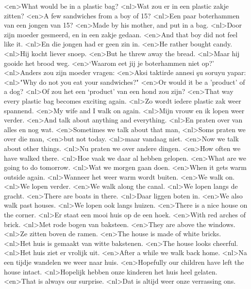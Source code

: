 <en>What would be in a plastic bag?
<nl>Wat zou er in een plastic zakje zitten?
<en>A few sandwiches from a boy of 15?
<nl>Een paar boterhammen van een jongen van 15?
<en>Made by his mother, and put in a bag.
<nl>Door zijn moeder gesmeerd, en in een zakje gedaan.
<en>And that boy did not feel like it.
<nl>En die jongen had er geen zin in.
<en>He rather bought candy.
<nl>Hij kocht liever snoep.
<en>But he threw away the bread.
<nl>Maar hij gooide het brood weg.
<en>`Waarom eet jij je boterhammen niet op?'
<nl>Anders zou zijn moeder vragen:
<en>Aksi taktirde annesi şu soruyu yapar:
<nl>"Why do not you eat your sandwiches?"
<en>Or  would it  be a 'product' of a dog?
<nl>Of zou het een `product' van een hond zou zijn?
<en>That way every plastic bag becomes exciting again.
<nl>Zo wordt iedere plastic zak weer spannend.
<en>My wife and I walk on again.
<nl>Mijn vrouw en ik lopen weer verder.
<en>And talk about anything and everything.
<nl>En praten over van alles en nog wat.
<en>Sometimes we talk about that man,
<nl>Soms praten we over die man,
<en>but not today.
<nl>maar vandaag niet.
<en>Now we talk about other things.
<nl>Nu praten we over andere dingen.
<en>How often we have walked there.
<nl>Hoe vaak we daar al hebben gelopen.
<en>What are we going to do tomorrow.
<nl>Wat we morgen gaan doen.
<en>When it  gets warm outside again.
<nl>Wanneer het weer warm wordt buiten.
<en>We walk on.
<nl>We lopen verder.
<en>We walk along the canal.
<nl>We lopen langs de gracht.
<en>There are boats in there.
<nl>Daar liggen boten in.
<en>We also walk past houses.
<nl>We lopen ook langs huizen.
<en>There is a nice house on the corner.
<nl>Er staat een mooi huis op de een hoek.
<en>With red arches of brick.
<nl>Met rode bogen van baksteen.
<en>They are above the windows.
<nl>Ze zitten boven de ramen.
<en>The house is made of white bricks.
<nl>Het huis is gemaakt van witte bakstenen.
<en>The house looks cheerful.
<nl>Het huis ziet er vrolijk uit.
<en>After a while we walk back home.
<nl>Na een tijdje wandelen we weer naar huis.
<en>Hopefully our children have left the house intact.
<nl>Hopelijk hebben onze kinderen het huis heel gelaten.
<en>That is always our surprise.
<nl>Dat is altijd weer onze verrassing ons.
